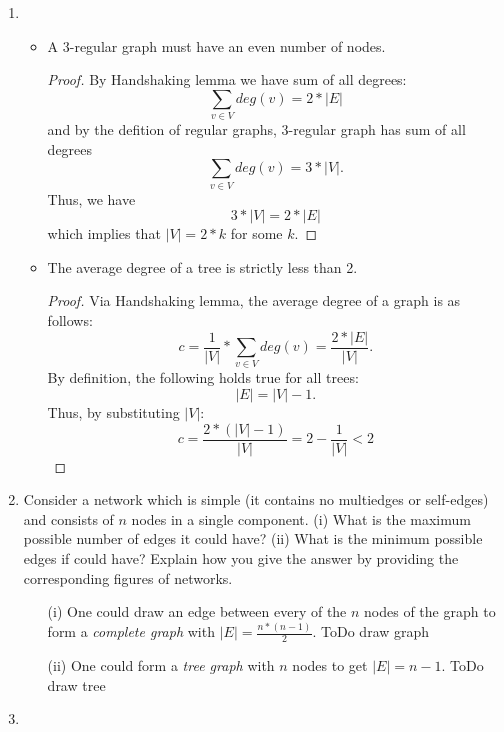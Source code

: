 \documentclass[12pt,a4paper,oneside,draft]{article}
\begin{document}
\begin{enumerate}
\begin{itemize}
    \end{itemize}
  \item
    \begin{itemize}
      \item
        A 3-regular graph must have an even number of nodes.
        \begin{proof}
          By Handshaking lemma we have sum of all degrees: $$\sum_{v \in V} deg(v) = 2 * |E|$$
          and by the defition of regular graphs, 3-regular graph has sum of all degrees
          $$\sum_{v \in V} deg(v) = 3 * |V|.$$
          Thus, we have $$3 * |V| = 2 * |E|$$ which implies that $|V| = 2 * k$ for some $k$.
        \end{proof}
      \item
        The average degree of a tree is strictly less than 2.
        \begin{proof}
          Via Handshaking lemma, the average degree of a graph is as follows:
            $$c = \frac{1}{|V|} * \sum_{v \in V} deg(v) = \frac{2 * |E|}{|V|}.$$
          By definition, the following holds true for all trees: $$|E| = |V| - 1.$$
          Thus, by substituting $|V|$:
            $$c = \frac{2 * (|V| - 1)}{|V|} = 2 - \frac{1}{|V|} < 2$$
        \end{proof}
    \end{itemize}
  \item
    Consider a network which is simple (it contains no multiedges or self-edges)
    and consists of $n$ nodes in a single component.
    \newline
    (i) What is the maximum possible number of edges it could have?
    \newline
    (ii) What is the minimum possible edges if could have?
    \newline
    Explain how you give the answer by providing the corresponding figures of networks.
    \begin{itemize}
      \item [(i) ]
        One could draw an edge between every of the $n$ nodes of the graph to
        form a \textit{complete graph} with $|E| = \frac{n * (n - 1)}{2}$.
        \newline ToDo draw graph
      \item [(ii) ]
        One could form a \textit{tree graph} with $n$ nodes to get $|E| = n - 1$.
        \newline ToDo draw tree
    \end{itemize}
  \item
    \begin{itemize}

\end{itemize}
\end{enumerate}
\end{document}
